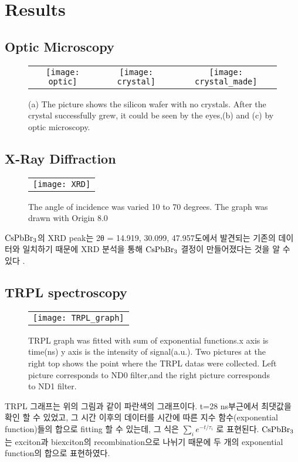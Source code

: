 \section{Results}


\subsection{Optic Microscopy}

\begin{figure}[h!]
	\begin{center}
		\begin{tabular}{ccc}
			\texttt{[image: optic]} &   \texttt{[image: crystal]}&
			\texttt{[image: crystal\_made]}
		\end{tabular}
		\caption{(a) The picture shows the silicon wafer with no crystals. After the crystal successfully grew, it could be seen by the eyes,(b) and (c) by optic microscopy.}	
		\label{fig:FIR221}
	\end{center}
\end{figure}
\subsection{X-Ray Diffraction}
\begin{figure}[h!]
	\begin{center}
		\begin{tabular}{c}
			\texttt{[image: XRD]}
		\end{tabular}
		\caption{The angle of incidence was varied 10 to 70 degrees. The graph was drawn with Origin 8.0}	
		\label{fig:FIR221}
	\end{center}
\end{figure}
$\rm{CsPbBr_3}$의 XRD peak는 2θ = 14.919, 30.099, 47.957도에서 발견되는 기존의 데이터와 일치하기 때문에 XRD 분석을 통해 $\rm{CsPbBr_3}$ 결정이 만들어졌다는 것을 알 수 있다 \cite{Jain2013}.

\subsection{TRPL spectroscopy}
\begin{figure}[h]
	\begin{center}
		\begin{tabular}{c}
			\texttt{[image: TRPL\_graph]}
		\end{tabular}
		\caption{TRPL graph was fitted with sum of exponential functions.x axis is time(ns) y axis is the intensity of signal(a.u.). Two pictures at the right top shows the point where the TRPL datas were collected. Left picture corresponds to ND0 filter,and the right picture corresponds to ND1 filter. }	
		\label{fig:FIR221}
	\end{center}
\end{figure}
TRPL 그래프는 위의 그림과 같이 파란색의 그래프이다. t=28 ns부근에서 최댓값을 확인 할 수 있었고, 그 시간 이후의 데이터를 시간에 따른 지수 함수(exponential function)들의 합으로 fitting 할 수 있는데, 그 식은 $\sum_{i}^{} {e}^{-t/{\tau}_{i}}$ 로 표현된다. $\rm{CsPbBr_3}$는 exciton과 biexciton의 recombination으로 나뉘기 때문에 두 개의 exponential function의 합으로 표현하였다. 

